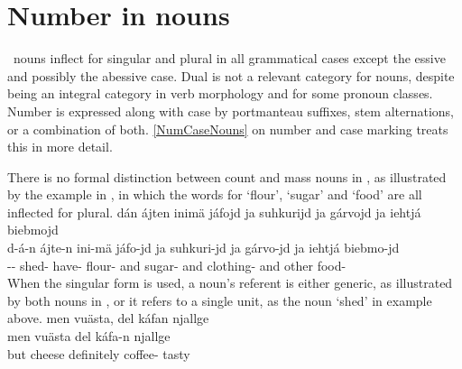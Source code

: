 \section{Number in nouns}\label{numberNouns}
\PS\ nouns inflect for singular and plural in all grammatical cases except the essive and possibly the abessive case. Dual is not a relevant category for nouns, despite being an integral category in verb morphology %
and for some pronoun classes. Number is expressed along with case by portmanteau suffixes, stem alternations, or a combination of both. %
\SEC\ref{NumCaseNouns} on number and case marking %
treats this in more detail.

There is no formal distinction between count and mass nouns in \PS, as illustrated by the example in , in which the words for ‘flour’, ‘sugar’ and ‘food’ are all inflected for plural. %
\ea\label{uncountableEx1}
\glll	dán ájten inimä jáfojd ja suhkurijd ja gárvojd ja iehtjá biebmojd\\
	d-á-n ájte-n ini-mä jáfo-jd ja suhkuri-jd ja gárvo-jd ja iehtjá biebmo-jd\\
	-- shed- have- flour- and sugar- and clothing- and other food-\\\nopagebreak
{}	
\z
When the singular form is used, a noun’s referent is either generic, as illustrated by both nouns in , or it refers to a single unit, %
as the noun  ‘shed’ in example  above. 
\ea\label{uncountableEx2}
\glll	men vuästa, del káfan njallge\\
	men vuästa del káfa-n njallge\\
	but cheese\BS{} definitely coffee- tasty\\\nopagebreak
{}	
\z


